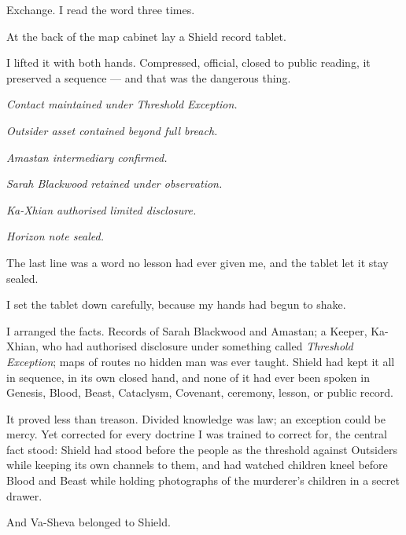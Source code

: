 Exchange. I read the word three times.\par

At the back of the map cabinet lay a Shield record tablet.\par

I lifted it with both hands. Compressed, official, closed to public reading, it preserved a sequence --- and that was the dangerous thing.\par

\textit{Contact maintained under Threshold Exception.}\par

\textit{Outsider asset contained beyond full breach.}\par

\textit{Amastan intermediary confirmed.}\par

\textit{Sarah Blackwood retained under observation.}\par

\textit{Ka-Xhian authorised limited disclosure.}\par

\textit{Horizon note sealed.}\par

The last line was a word no lesson had ever given me, and the tablet let it stay sealed.\par


I set the tablet down carefully, because my hands had begun to shake.\par

I arranged the facts. Records of Sarah Blackwood and Amastan; a Keeper, Ka-Xhian, who had authorised disclosure under something called \textit{Threshold Exception}; maps of routes no hidden man was ever taught. Shield had kept it all in sequence, in its own closed hand, and none of it had ever been spoken in Genesis, Blood, Beast, Cataclysm, Covenant, ceremony, lesson, or public record.\par

It proved less than treason. Divided knowledge was law; an exception could be mercy. Yet corrected for every doctrine I was trained to correct for, the central fact stood: Shield had stood before the people as the threshold against Outsiders while keeping its own channels to them, and had watched children kneel before Blood and Beast while holding photographs of the murderer's children in a secret drawer.\par

And Va-Sheva belonged to Shield.\par

